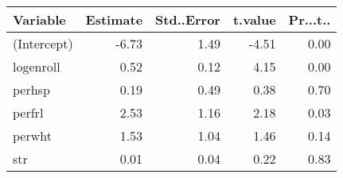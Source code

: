 \begin{tabular}{lrrrr}
  \hline
Variable & Estimate & Std..Error & t.value & Pr...t.. \\ 
  \hline
(Intercept) & -6.73 & 1.49 & -4.51 & 0.00 \\ 
  logenroll & 0.52 & 0.12 & 4.15 & 0.00 \\ 
  perhsp & 0.19 & 0.49 & 0.38 & 0.70 \\ 
  perfrl & 2.53 & 1.16 & 2.18 & 0.03 \\ 
  perwht & 1.53 & 1.04 & 1.46 & 0.14 \\ 
  str & 0.01 & 0.04 & 0.22 & 0.83 \\ 
   \hline
\end{tabular}
